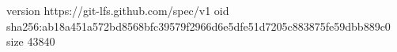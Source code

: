 version https://git-lfs.github.com/spec/v1
oid sha256:ab18a451a572bd8568bfc39579f2966d6e5dfe51d7205c883875fe59dbb889c0
size 43840
